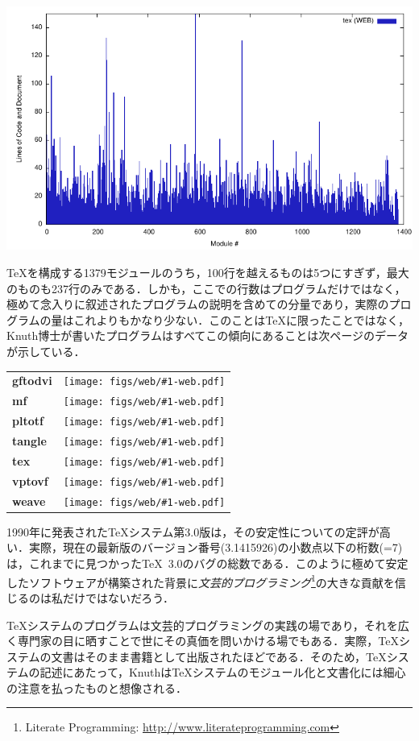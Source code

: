 \documentclass [11pt] {jsarticle}
\begin{document}
\centerline {\includegraphics [width=.80\linewidth]{figs/web/tex-web.pdf}}

\TeX を構成する1379モジュールのうち，100行を越えるものは5つにすぎず，最大のものも237行のみである．しかも，ここでの行数はプログラムだけではなく，極めて念入りに叙述されたプログラムの説明を含めての分量であり，実際のプログラムの量はこれよりもかなり少ない．このことは\TeX に限ったことではなく，Knuth博士が書いたプログラムはすべてこの傾向にあることは次ページのデータが示している．

\newcommand\webfile[1]{\textbf {#1} &
  \texttt{[image: figs/web/\#1-web.pdf]}}

\begin {tabular}{ll}
  \webfile {gftodvi} \\
  \webfile {mf} \\
  \webfile {pltotf} \\
  \webfile {tangle} \\
  \webfile {tex} \\
  \webfile {vptovf} \\
  \webfile {weave}
\end {tabular}
\bigskip

1990年に発表された\TeX システム第3.0版は，その安定性についての定評が高い．実際，現在の最新版のバージョン番号(3.1415926)の小数点以下の桁数(=7)は，これまでに見つかった\TeX~3.0のバグの総数である．このように極めて安定したソフトウェアが構築された背景に\emph {文芸的プログラミング}\cite {Knuth92Literate-programming}\footnote {Literate Programming: \url {http://www.literateprogramming.com}}の大きな貢献を信じるのは私だけではないだろう．

\TeX システムのプログラムは文芸的プログラミングの実践の場であり，それを広く専門家の目に晒すことで世にその真価を問いかける場でもある．実際，\TeX システムの文書はそのまま書籍\cite {Knuth86TeX:-The-Program}として出版されたほどである．そのため，\TeX システムの記述にあたって，Knuthは\TeX システムのモジュール化と文書化には細心の注意を払ったものと想像される．
\end{document}

